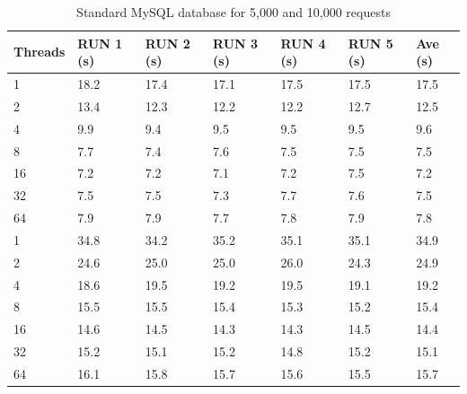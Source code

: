 \documentclass{article}
\begin{document}
\begin{table}[]
	\centering
	\caption{Standard MySQL database for 5,000 and 10,000 requests}
	\label{my-label}
	\begin{tabular}{@{}lllllll@{}}
		\toprule
		Threads & RUN 1 (s)   & RUN 2 (s)   & RUN 3 (s)   & RUN 4 (s)   & RUN 5 (s)   & Ave (s)      \\ \midrule
		1       & 18.2 & 17.4  & 17.1 & 17.5 & 17.5 & 17.5 \\
		2       & 13.4   & 12.3   & 12.2 & 12.2 & 12.7 & 12.5 \\
		4       & 9.9  & 9.4  & 9.5   & 9.5  & 9.5  & 9.6  \\
		8       & 7.7  & 7.4   & 7.6  & 7.5  & 7.5  & 7.5  \\
		16      & 7.2  & 7.2  & 7.1  & 7.2   & 7.5  & 7.2  \\
		32      & 7.5  & 7.5  & 7.3  & 7.7  & 7.6  & 7.5  \\
		64      & 7.9   & 7.9  & 7.7   & 7.8  & 7.9   & 7.8  \\\midrule
		1       & 34.8 & 34.2 & 35.2 & 35.1   & 35.1 & 34.9 \\
		2       & 24.6 & 25.0 & 25.0 & 26.0 & 24.3 & 24.9   \\
		4       & 18.6 & 19.5 & 19.2 & 19.5 & 19.1 & 19.2 \\
		8       & 15.5 & 15.5 & 15.4 & 15.3 & 15.2 & 15.4 \\
		16      & 14.6 & 14.5 & 14.3  & 14.3 & 14.5 & 14.4  \\
		32      & 15.2 & 15.1 & 15.2 & 14.8 & 15.2  & 15.1  \\
		64      & 16.1 & 15.8 & 15.7 & 15.6 & 15.5 & 15.7 \\ \bottomrule
	\end{tabular}
\end{table}
\end{document}
